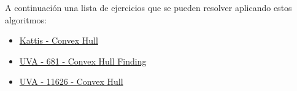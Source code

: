 A continuación una lista de ejercicios que se pueden resolver aplicando estos algoritmos:

\begin{itemize}
	\item \href{https://open.kattis.com/problems/convexhull}{Kattis - Convex Hull}
	\item \href{https://onlinejudge.org/index.php?option=onlinejudge&Itemid=8&page=show_problem&problem=622}{UVA - 681 - Convex Hull Finding}
	\item \href{https://onlinejudge.org/index.php?option=onlinejudge&Itemid=8&page=show_problem&problem=2673}{UVA - 11626 - Convex Hull}
\end{itemize}